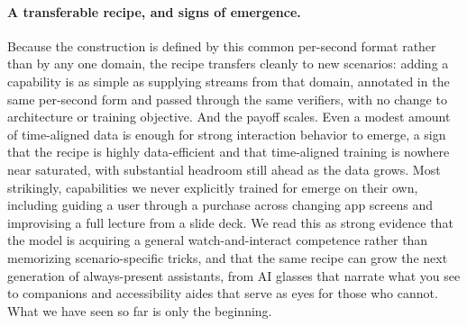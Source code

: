\documentclass{llmxive}
\begin{document}
\paragraph{\textbf{A transferable recipe, and signs of emergence.}}
Because the construction is defined by this common per-second format rather than by any one domain, the recipe transfers cleanly to new scenarios: adding a capability is as simple as supplying streams from that domain, annotated in the same per-second form and passed through the same verifiers, with no change to architecture or training objective. And the payoff scales. Even a modest amount of time-aligned data is enough for strong interaction behavior to emerge, a sign that the recipe is highly data-efficient and that time-aligned training is nowhere near saturated, with substantial headroom still ahead as the data grows. Most strikingly, capabilities we never explicitly trained for emerge on their own, including guiding a user through a purchase across changing app screens and improvising a full lecture from a slide deck. We read this as strong evidence that the model is acquiring a general watch-and-interact competence rather than memorizing scenario-specific tricks, and that the same recipe can grow the next generation of always-present assistants, from AI glasses that narrate what you see to companions and accessibility aides that serve as eyes for those who cannot. What we have seen so far is only the beginning. 





\end{document}
